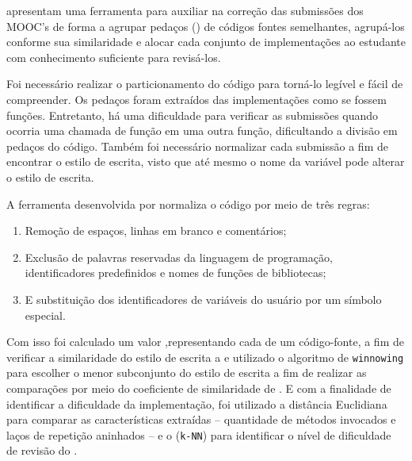 	     apresentam uma ferramenta para auxiliar na correção das
	    submissões dos MOOC's de forma a agrupar pedaços () de códigos
	    fontes semelhantes, agrupá-los conforme sua similaridade e alocar cada conjunto
	    de implementações ao estudante com conhecimento suficiente para revisá-los.
	    
	    Foi necessário realizar o particionamento do código para torná-lo legível
	    e fácil de compreender. Os pedaços foram extraídos das implementações como
	    se fossem funções. Entretanto, há uma dificuldade para verificar as submissões
	    quando ocorria uma chamada de função em uma outra função, dificultando a divisão
	    em pedaços do código. Também foi necessário normalizar cada submissão a fim de
	    encontrar o estilo de escrita, visto que até mesmo o nome da variável pode
	    alterar o estilo de escrita.
	    
	    A ferramenta desenvolvida por  normaliza o código por
	    meio de três regras:
	    
	    \begin{enumerate}
	    	\item Remoção de espaços, linhas em branco e comentários;
	    	\item Exclusão de palavras reservadas da linguagem de programação,
	    	identificadores predefinidos e nomes de funções de bibliotecas;
	    	\item E substituição dos identificadores de variáveis do usuário por um
	    	símbolo especial.
	    \end{enumerate}
	    
	    Com isso foi calculado um valor ,representando cada 
	    de um código-fonte, a fim de verificar a similaridade do estilo de escrita 
	    a  e utilizado o algoritmo de \texttt{winnowing} \cite{schleimer2003}
	    para escolher o menor subconjunto do estilo de escrita a fim de realizar as
	    comparações por meio do coeficiente de similaridade de  \cite{jaccard1901}. E
	    com a finalidade de identificar a dificuldade da implementação, foi utilizado
	    a distância Euclidiana para comparar as características extraídas -- quantidade
	    de métodos invocados e laços de repetição aninhados -- e o 
	    (\texttt{k-NN}) para identificar o nível de dificuldade de revisão do
	    .
	    
